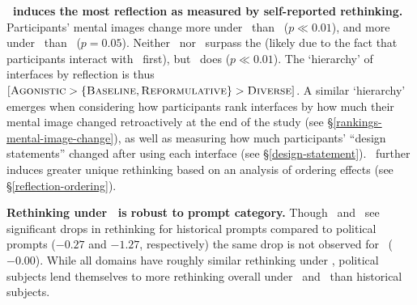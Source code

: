 \textbf{\agonistic~induces the most reflection as measured by self-reported rethinking.} Participants' mental images change more under \agonistic~than ~($p \ll 0.01$), and more under ~than \diverse~($p = 0.05$). Neither ~nor \diverse~surpass the \baseline (likely due to the fact that participants interact with \baseline~first), but \agonistic~does ($p \ll 0.01$).
The `hierarchy' of interfaces by reflection is thus $\left[ \textsf{\textsc{Agonistic}}> \{ \textsf{\textsc{Baseline}}, \textsf{\textsc{Reformulative}}\} > \textsf{\textsc{Diverse}}\right]$.
A similar `hierarchy' emerges when considering how participants rank interfaces by how much their mental image changed retroactively at the end of the study (see \S\ref{rankings-mental-image-change}), as well as measuring how much participants' ``design statements'' changed after using each interface (see \S\ref{design-statement}). \agonistic~further induces greater unique rethinking based on an analysis of ordering effects (see \S\ref{reflection-ordering}).

\textbf{Rethinking under \agonistic~is robust to prompt category.} 
Though  \diverse~and ~see significant drops in rethinking for historical prompts compared to political prompts ($-0.27$ and $-1.27$, respectively) the same drop is not observed for \agonistic~($-0.00$).
While all domains have roughly similar rethinking under \agonistic, political subjects lend themselves to more rethinking overall under \diverse~and ~than historical subjects.


